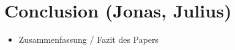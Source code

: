 \section{Conclusion (Jonas, Julius)}

\begin{itemize}
    \item Zusammenfassung / Fazit des Papers
\end{itemize}
